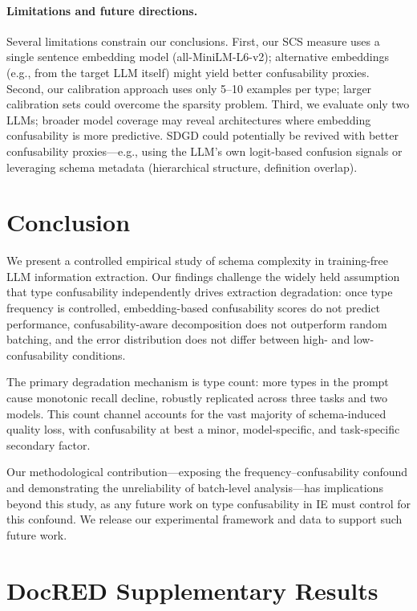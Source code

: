 \documentclass[11pt,a4paper]{article}
\begin{document}
\paragraph{Limitations and future directions.}
Several limitations constrain our conclusions.
First, our SCS measure uses a single sentence embedding model (all-MiniLM-L6-v2); alternative embeddings (e.g., from the target LLM itself) might yield better confusability proxies.
Second, our calibration approach uses only 5--10 examples per type; larger calibration sets could overcome the sparsity problem.
Third, we evaluate only two LLMs; broader model coverage may reveal architectures where embedding confusability is more predictive.
SDGD could potentially be revived with better confusability proxies---e.g., using the LLM's own logit-based confusion signals or leveraging schema metadata (hierarchical structure, definition overlap).

\section{Conclusion}

We present a controlled empirical study of schema complexity in training-free LLM information extraction.
Our findings challenge the widely held assumption that type confusability independently drives extraction degradation: once type frequency is controlled, embedding-based confusability scores do not predict performance, confusability-aware decomposition does not outperform random batching, and the error distribution does not differ between high- and low-confusability conditions.

The primary degradation mechanism is type count: more types in the prompt cause monotonic recall decline, robustly replicated across three tasks and two models.
This count channel accounts for the vast majority of schema-induced quality loss, with confusability at best a minor, model-specific, and task-specific secondary factor.

Our methodological contribution---exposing the frequency--confusability confound and demonstrating the unreliability of batch-level analysis---has implications beyond this study, as any future work on type confusability in IE must control for this confound.
We release our experimental framework and data to support such future work.



\appendix
\section{DocRED Supplementary Results}
\label{app:docred}
\end{document}
